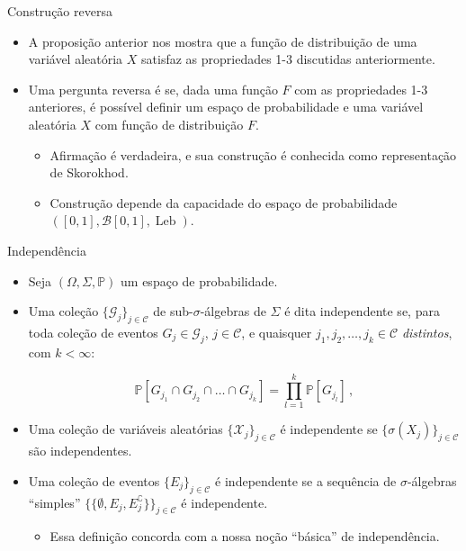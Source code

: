 \documentclass[11pt]{beamer}
\begin{document}
\begin{frame}{Construção reversa}
\begin{itemize}
	\item A proposição anterior nos mostra que a função de distribuição de uma variável aleatória $X$ satisfaz as propriedades 1-3 discutidas anteriormente.
	\item Uma pergunta reversa é se, dada uma função $F$ com as propriedades 1-3 anteriores, é possível definir um espaço de probabilidade e uma variável aleatória $X$ com função de distribuição $F$.
	\begin{itemize}
		\item Afirmação é verdadeira, e sua construção é conhecida como {\color{blue}representação de Skorokhod}.
		\item Construção depende da capacidade do espaço de probabilidade $([0,1],\mathcal{B}[0,1], \operatorname{Leb})$.
	\end{itemize}
\end{itemize}
\end{frame}
\begin{frame}{Independência}
	\begin{itemize}
		\item Seja $(\Omega, \Sigma,\mathbb{P})$ um espaço de probabilidade.
		\item Uma coleção $\{\mathcal{G}_j\}_{j \in \mathcal{C}}$ de sub-$\sigma$-álgebras de $\Sigma$ é dita independente se, para toda coleção de eventos $G_j \in \mathcal{G}_j$, $j \in \mathcal{C}$, e quaisquer $j_1, j_2, \ldots, j_k \in \mathcal{C}$ \emph{distintos}, com $k < \infty$:
		
		$$\mathbb{P}[G_{j_1}\cap G_{j_2}\cap \ldots \cap G_{j_k}] = \prod_{l=1}^k \mathbb{P}[G_{j_l}]\, ,$$
		\item Uma coleção de variáveis aleatórias $\{\mathcal{X}_j \}_{j \in \mathcal{C}}$ é independente se $\{\sigma(X_j)\}_{j \in \mathcal{C}}$ são independentes.
		\item Uma coleção de eventos $\{E_j\}_{j\in \mathcal{C}}$ é independente se a sequência de $\sigma$-álgebras ``simples''   $\{\{\emptyset, E_j, E_j^{\complement}\}\}_{j\in \mathcal{C}}$ é independente.
		\begin{itemize}
			\item Essa definição concorda com a nossa noção ``básica'' de independência.
		\end{itemize}
	\end{itemize}
\end{frame}
\end{document}
